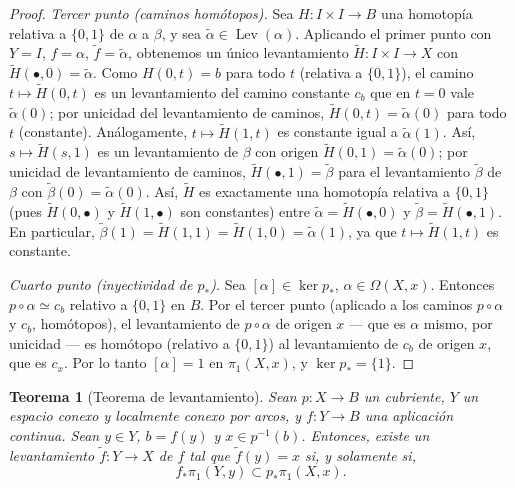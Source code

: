 \documentclass[11pt,a4paper]{article}
\theoremstyle{plain}
\newtheorem{theorem}{Teorema}[section]
\theoremstyle{definition}
\theoremstyle{remark}
\DeclareMathOperator{\Lev}{Lev}
\begin{document}
\begin{proof}
\emph{Tercer punto (caminos homótopos).} Sea $H:I\times I\to B$ una
homotopía relativa a $\{0,1\}$ de $\alpha$ a $\beta$, y sea
$\tilde\alpha\in\Lev(\alpha)$. Aplicando el primer punto con $Y=I$,
$f=\alpha$, $\tilde f=\tilde\alpha$, obtenemos un único levantamiento
$\tilde H:I\times I\to X$ con $\tilde H(\bullet,0)=\tilde\alpha$. Como
$H(0,t)=b$ para todo $t$ (relativa a $\{0,1\}$), el camino
$t\mapsto\tilde H(0,t)$ es un levantamiento del camino constante $c_b$
que en $t=0$ vale $\tilde\alpha(0)$; por unicidad del levantamiento de
caminos, $\tilde H(0,t)=\tilde\alpha(0)$ para todo $t$ (constante).
Análogamente, $t\mapsto\tilde H(1,t)$ es constante igual a
$\tilde\alpha(1)$. Así, $s\mapsto\tilde H(s,1)$ es un levantamiento de
$\beta$ con origen $\tilde H(0,1)=\tilde\alpha(0)$; por unicidad de
levantamiento de caminos, $\tilde H(\bullet,1)=\tilde\beta$ para el
levantamiento $\tilde\beta$ de $\beta$ con $\tilde\beta(0)=\tilde\alpha(0)$.
Así, $\tilde H$ es exactamente una homotopía relativa a $\{0,1\}$ (pues
$\tilde H(0,\bullet)$ y $\tilde H(1,\bullet)$ son constantes) entre
$\tilde\alpha=\tilde H(\bullet,0)$ y $\tilde\beta=\tilde H(\bullet,1)$. En
particular, $\tilde\beta(1)=\tilde H(1,1)=\tilde H(1,0)=\tilde\alpha(1)$,
ya que $t\mapsto\tilde H(1,t)$ es constante.

\emph{Cuarto punto (inyectividad de $p_*$).} Sea $[\alpha]\in\ker p_*$,
$\alpha\in\Omega(X,x)$. Entonces $p\circ\alpha\simeq c_b$ relativo a
$\{0,1\}$ en $B$. Por el tercer punto (aplicado a los caminos $p\circ\alpha$
y $c_b$, homótopos), el levantamiento de $p\circ\alpha$ de origen $x$
--- que es $\alpha$ mismo, por unicidad --- es homótopo (relativo a
$\{0,1\}$) al levantamiento de $c_b$ de origen $x$, que es $c_x$. Por lo
tanto $[\alpha]=1$ en $\pi_1(X,x)$, y $\ker p_*=\{1\}$.
\end{proof}

\begin{theorem}[Teorema de levantamiento]
\label{thm:teo-levantamiento}
Sean $p:X\to B$ un cubriente, $Y$ un espacio conexo y localmente conexo por
arcos, y $f:Y\to B$ una aplicación continua. Sean $y\in Y$, $b=f(y)$ y
$x\in p^{-1}(b)$. Entonces, existe un levantamiento $\tilde f:Y\to X$ de $f$
tal que $\tilde f(y)=x$ si, y solamente si,
\[
f_*\pi_1(Y,y)\subset p_*\pi_1(X,x).
\]
\end{theorem}
\end{document}
